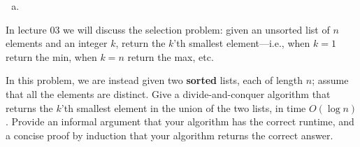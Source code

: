 \documentclass{article}
\begin{document}
\begin{solution}
	\begin{mdframed}
	\begin{enumerate}[(a)]
	\item 
	\end{enumerate}
	\end{mdframed}
\end{solution}

\begin{exercise}[subtitle={Preview of Selection} (6 pts)]
In lecture 03 we will discuss the selection problem: given an unsorted list of $n$ elements and an integer $k$, return the $k$'th smallest element---i.e., when $k=1$ return the min, when $k=n$ return the max, etc.

In this problem, we are instead given two \textbf{sorted} lists, each of length $n$; assume that all the elements are distinct. Give a divide-and-conquer algorithm that returns the $k$'th smallest element in the union of the two lists, in time $O(\log n)$. Provide an informal argument that your algorithm has the correct runtime, and a concise proof by induction that your algorithm returns the correct answer.
\end{exercise}
\begin{solution}
	\begin{mdframed}
	\end{mdframed}
\end{solution}
\end{document}

